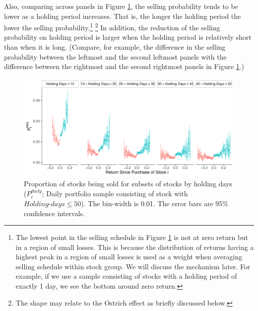 \documentclass[11pt, a4paper]{article}
\begin{document}
Also, comparing across panels in Figure \ref{figure:prop_by_days_less50}, the selling probability tends to be lower as a holding period increases. That is, the longer the holding period the lower the selling probability.\footnote{The lowest point in the selling schedule in Figure \ref{figure:prop_by_days_less50} is not at zero return but in a region of small losses. This is because the distribution of returns having a highest peak in a region of small losses is used as a weight when averaging selling schedule within stock group. We will discuss the mechanism later. For example, if we use a sample consisting of stocks with a holding period of exactly 1 day, we see the bottom around zero return.} \footnote{The shape may relate to the Ostrich effect as briefly discussed below.} In addition, the reduction of the selling probability on holding period is larger when the holding period is relatively short than when it is long. (Compare, for example, the difference in the selling probability between the leftmost and the second leftmost panels with the difference between the rightmost and the second rightmost panels in Figure \ref{figure:prop_by_days_less50}.)

\begin{figure}[H]
	\centering
	\includegraphics[width=1\columnwidth]{barc_schedule_daily_by_days_less50_NG_NL.pdf}
	\caption{\small Proportion of stocks being sold for subsets of stocks by holding days ($P^{daily}_{i}$; Daily portfolio sample consisting of stock with $Holding\mbox{-}days\leq50$). The bin-width is 0.01. The error bars are 95\% confidence intervals.}
	\label{figure:prop_by_days_less50}
\end{figure}
\end{document}
